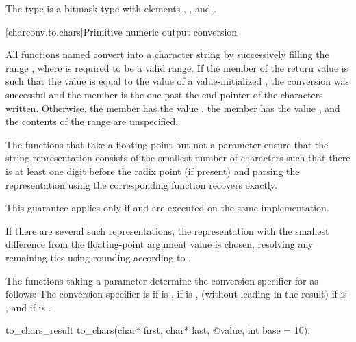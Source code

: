 \pnum
The type  is a bitmask type
with elements , , and .

[charconv.to.chars]{Primitive numeric output conversion}

\pnum
All functions named 
convert  into a character string
by successively filling the range
,
where  is required to be a valid range.
If the member 
of the return value
is such that the value
is equal to the value of a value-initialized ,
the conversion was successful
and the member 
is the one-past-the-end pointer of the characters written.
Otherwise,
the member  has the value ,
the member  has the value ,
and the contents of the range  are unspecified.

\pnum
The functions that take a floating-point 
but not a  parameter
ensure that the string representation
consists of the smallest number of characters
such that
there is at least one digit before the radix point (if present) and
parsing the representation using the corresponding  function
recovers  exactly.
\begin{note}
This guarantee applies only if
 and 
are executed on the same implementation.
\end{note}
If there are several such representations,
the representation with the smallest difference from
the floating-point argument value is chosen,
resolving any remaining ties using rounding according to
.

\pnum
The functions taking a  parameter
determine the conversion specifier for  as follows:
The conversion specifier is
 if  is ,
 if  is ,
 (without leading  in the result)
if  is ,
and
 if  is .

%
\begin{itemdecl}
to_chars_result to_chars(char* first, char* last, @\seebelow@ value, int base = 10);
\end{itemdecl}

